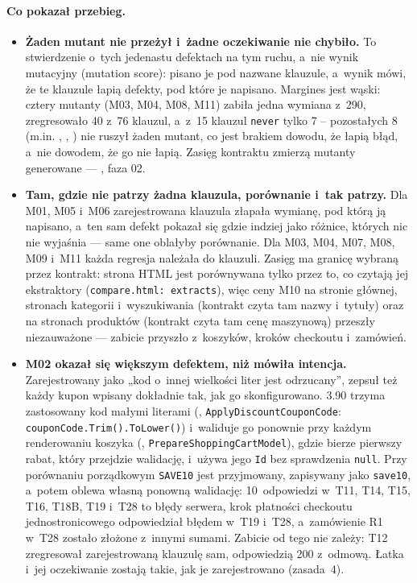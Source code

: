 \paragraph{Co pokazał przebieg.}
\begin{itemize}
  \item \textbf{Żaden mutant nie przeżył i~żadne oczekiwanie nie chybiło.} To stwierdzenie
    o~tych jedenastu defektach na tym ruchu, a~nie wynik mutacyjny (mutation score): pisano je
    pod nazwane klauzule, a~wynik mówi, że te klauzule łapią defekty, pod które je napisano.
    Margines jest wąski: cztery mutanty (M03, M04, M08, M11) zabiła jedna wymiana z~290,
    zregresowało 40 z~76 klauzul, a~z~15 klauzul \texttt{never} tylko 7 -- pozostałych 8
    (m.in. , ,
    ) nie ruszył żaden mutant, co jest brakiem dowodu, że łapią
    błąd, a~nie dowodem, że go nie łapią.
    Zasięg kontraktu zmierzą mutanty generowane --- , faza 02.
  \item \textbf{Tam, gdzie nie patrzy żadna klauzula, porównanie i~tak patrzy.} Dla M01, M05
    i~M06 zarejestrowana klauzula złapała wymianę, pod którą ją napisano, a~ten sam defekt
    pokazał się gdzie indziej jako różnice, których nic nie wyjaśnia --- same one oblałyby
    porównanie. Dla M03, M04, M07, M08, M09 i~M11 każda regresja należała do klauzuli. Zasięg
    ma granicę wybraną przez kontrakt: strona HTML jest porównywana tylko przez to, co czytają
    jej ekstraktory (\texttt{compare.html: extracts}), więc ceny M10 na stronie głównej,
    stronach kategorii i~wyszukiwania (kontrakt czyta tam nazwy i~tytuły) oraz na stronach
    produktów (kontrakt czyta tam cenę maszynową) przeszły niezauważone --- zabicie przyszło
    z~koszyków, kroków checkoutu i~zamówień.
  \item \textbf{M02 okazał się większym defektem, niż mówiła intencja.} Zarejestrowany jako
    „kod o~innej wielkości liter jest odrzucany”, zepsuł też każdy kupon wpisany dokładnie
    tak, jak go skonfigurowano. 3.90 trzyma zastosowany kod małymi literami
    (, \texttt{ApplyDiscountCouponCode}:
    \texttt{couponCode.Trim().ToLower()}) i~waliduje go ponownie przy każdym renderowaniu
    koszyka (,
    \texttt{PrepareShoppingCartModel}), gdzie bierze pierwszy rabat, który przejdzie
    walidację, i~używa jego \texttt{Id} bez sprawdzenia \texttt{null}. Przy porównaniu
    porządkowym \texttt{SAVE10} jest przyjmowany, zapisywany jako \texttt{save10}, a~potem
    oblewa własną ponowną walidację: 10~odpowiedzi w~T11, T14, T15, T16, T18B, T19 i~T28 to
    błędy serwera, krok płatności checkoutu jednostronicowego odpowiedział błędem w~T19
    i~T28, a~zamówienie R1 w~T28 zostało złożone z~innymi sumami. Zabicie od tego nie
    zależy: T12 zregresował zarejestrowaną klauzulę sam, odpowiedzią 200 z~odmową. Łatka
    i~jej oczekiwanie zostają takie, jak je zarejestrowano (zasada~4).
\end{itemize}

